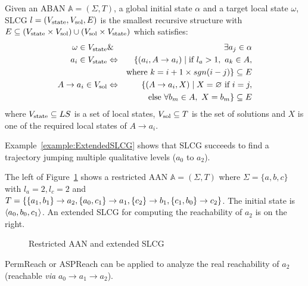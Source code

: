 \begin{definition}\label{def:SLCGR}
Given an ABAN $\mathbb{A} = (\Sigma,T)$, a global initial state $\alpha$ and a target local state $\omega$, SLCG $l= (V_{\mathrm{state}},V_{\mathrm{sol}},E)$ is the smallest recursive structure with $E \subseteq (V_{\mathrm{state}}\times V_{\mathrm{sol}})\cup (V_{\mathrm{sol}}\times V_{\mathrm{state}})$ which satisfies:
\begin{eqnarray*}
    \omega\in V_{\mathrm{state}} &\&& \exists a_j\in \alpha \\
    a_i\in V_{\mathrm{state}} &\Leftrightarrow& \{ (a_i, A\to a_i)\mid \text{if } l_a>1,\ a_k \in A,\\
    &&\text{where } k= i+1\times sgn(i-j)  \}\subseteq E\\
    A\to a_i\in V_{\mathrm{sol}}&\Leftrightarrow& \{ (A\to a_i,X)\mid X= \varnothing \text{ if } i=j,\\
    &&\text{else } \forall b_m\in A,\ X= b_m\}\subseteq E
\end{eqnarray*}
where $V_{\mathrm{state}}\subseteq LS$ is a set of local states, $V_{\mathrm{sol}}\subseteq T$ is the set of solutions and $X$ is one of the required local states of $A\to a_i$.
\end{definition}
Example~\ref{example:ExtendedSLCG} shows that SLCG succeeds to find a trajectory jumping multiple qualitative levels ($a_0$ to $a_2$).
\begin{example}\label{example:ExtendedSLCG}
The left of Figure~\ref{fig:ExtendedSLCG} shows a restricted AAN $\mathbb{A}=(\Sigma,T)$ where $\Sigma=\{a,b,c\} $ with $l_a=2, l_c=2$ and $T=\{\{a_1,b_1\}\rightarrow a_2,\{a_0,c_1\}\rightarrow a_1,\{c_2\}\rightarrow b_1,\{c_1,b_0\}\rightarrow c_2\}$.
The initial state is $\langle a_0,b_0,c_1\rangle$.
An extended SLCG for computing the reachability of $a_2$ is on the right.

\begin{figure}[ht]
    \centering
    
    \caption[Restricted AAN and extended SLCG]{Restricted AAN and extended SLCG}
    \label{fig:ExtendedSLCG}
\end{figure}

PermReach or ASPReach can be applied to analyze the real reachability of $a_2$ (reachable \textit{via} $a_0\to a_1\to a_2$).
\end{example}

